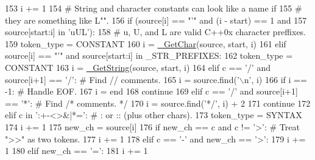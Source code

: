 \begin{DoxyCode}
153                 i += 1
154             \textcolor{comment}{# String and character constants can look like a name if}
155             \textcolor{comment}{# they are something like L"".}
156             \textcolor{keywordflow}{if} (source[i] == \textcolor{stringliteral}{"'"} \textcolor{keywordflow}{and} (i - start) == 1 \textcolor{keywordflow}{and}
157                 source[start:i] \textcolor{keywordflow}{in} \textcolor{stringliteral}{'uUL'}):
158                 \textcolor{comment}{# u, U, and L are valid C++0x character preffixes.}
159                 token\_type = CONSTANT
160                 i = \hyperlink{namespacecpp_1_1tokenize_abeb75f493bd3035922daf150f5213ba9}{\_GetChar}(source, start, i)
161             \textcolor{keywordflow}{elif} source[i] == \textcolor{stringliteral}{"'"} \textcolor{keywordflow}{and} source[start:i] \textcolor{keywordflow}{in} \_STR\_PREFIXES:
162                 token\_type = CONSTANT
163                 i = \hyperlink{namespacecpp_1_1tokenize_a3c6a8b154110b4b6a0385ccc3469db77}{\_GetString}(source, start, i)
164         \textcolor{keywordflow}{elif} c == \textcolor{stringliteral}{'/'} \textcolor{keywordflow}{and} source[i+1] == \textcolor{stringliteral}{'/'}:    \textcolor{comment}{# Find // comments.}
165             i = source.find(\textcolor{stringliteral}{'\(\backslash\)n'}, i)
166             \textcolor{keywordflow}{if} i == -1:  \textcolor{comment}{# Handle EOF.}
167                 i = end
168             \textcolor{keywordflow}{continue}
169         \textcolor{keywordflow}{elif} c == \textcolor{stringliteral}{'/'} \textcolor{keywordflow}{and} source[i+1] == \textcolor{stringliteral}{'*'}:    \textcolor{comment}{# Find /* comments. */}
170             i = source.find(\textcolor{stringliteral}{'*/'}, i) + 2
171             \textcolor{keywordflow}{continue}
172         \textcolor{keywordflow}{elif} c \textcolor{keywordflow}{in} \textcolor{stringliteral}{':+-<>&|*='}:                   \textcolor{comment}{# : or :: (plus other chars).}
173             token\_type = SYNTAX
174             i += 1
175             new\_ch = source[i]
176             \textcolor{keywordflow}{if} new\_ch == c \textcolor{keywordflow}{and} c != \textcolor{stringliteral}{'>'}:         \textcolor{comment}{# Treat ">>" as two tokens.}
177                 i += 1
178             \textcolor{keywordflow}{elif} c == \textcolor{stringliteral}{'-'} \textcolor{keywordflow}{and} new\_ch == \textcolor{stringliteral}{'>'}:
179                 i += 1
180             \textcolor{keywordflow}{elif} new\_ch == \textcolor{stringliteral}{'='}:
181                 i += 1

\end{DoxyCode}
